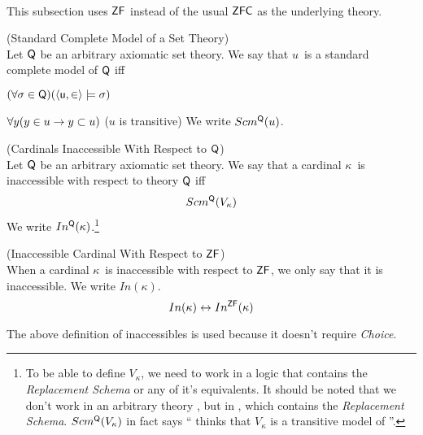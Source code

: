 
\

This subsection uses $\sf{ZF}$ instead of the usual $\sf{ZFC}$ as the underlying theory. %

\begin{definition}{(Standard Complete Model of a Set Theory)}\label{def:scm_q}\\
Let $\sf{Q}$ be an arbitrary axiomatic set theory.
We say that $u$ is a standard complete model of $\sf{Q}$ iff
\bce[(i)]
\item $(\forall \sigma \in \sf{Q})(\langle u, \in \rangle \models \sigma)$
\item $\forall y (y \in u \then y \subset u)$ ($u$ is transitive)
\ece 
We write $Scm^{\sf{Q}}(u)$.
\end{definition}

\begin{definition}{(Cardinals Inaccessible With Respect to $\sf{Q}$)}\label{def:levy_inaccessible_q}\\
Let $\sf{Q}$ be an arbitrary axiomatic set theory. We say that a cardinal $\kappa$ is inaccessible with respect to theory $\sf{Q}$ iff
\begin{equation}
Scm^{\sf{Q}}(V_\kappa)
\end{equation}
We write $In^{\sf{Q}}(\kappa)$.\footnote{To be able to define $V_\kappa$, we need to work in a logic that contains the \emph{Replacement Schema} or any of it's equivalents. It should be noted that we don't work in an arbitrary theory , but in , which contains the \emph{Replacement Schema}. $Scm^{\sf{Q}}(V_\kappa)$ in fact says `` thinks that $V_\kappa$ is a transitive model of ''.}
\end{definition}

\begin{definition}{(Inaccessible Cardinal With Respect to $\sf{ZF}$)}\label{def:levy_inaccessible}\\
When a cardinal $\kappa$ is inaccessible with respect to $\sf{ZF}$, we only say that it is inaccessible. We write $In(\kappa)$.
\begin{equation}
In(\kappa) \iff In^{\sf{ZF}}(\kappa)
\end{equation}
\end{definition}
The above definition of inaccessibles is used because it doesn't require \emph{Choice}.

